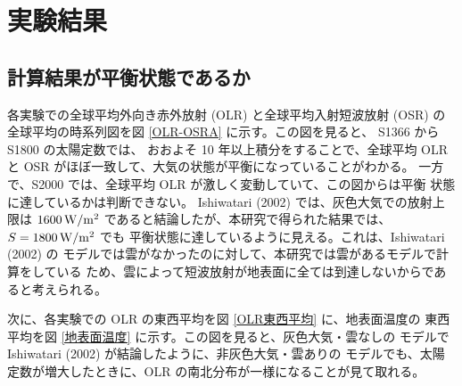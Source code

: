 \documentclass[body]{subfiles}
\begin{document}
\chapter{実験結果}

\section{計算結果が平衡状態であるか}

各実験での全球平均外向き赤外放射 (OLR) と全球平均入射短波放射 (OSR) の
全球平均の時系列図を図 \ref{OLR-OSRA} に示す。この図を見ると、 S1366
から S1800 の太陽定数では、 おおよそ 10 年以上積分をすることで、全球平均
OLR と OSR がほぼ一致して、大気の状態が平衡になっていることがわかる。
一方で、S2000 では、全球平均 OLR が激しく変動していて、この図からは平衡
状態に達しているかは判断できない。
Ishiwatari \etal (2002) では、灰色大気での放射上限は \(1600\hmu{W/m^2}\)
であると結論したが、本研究で得られた結果では、\(S=1800\hmu{W/m^2}\) でも
平衡状態に達しているように見える。これは、Ishiwatari \etal (2002) の
モデルでは雲がなかったのに対して、本研究では雲があるモデルで計算をしている
ため、雲によって短波放射が地表面に全ては到達しないからであると考えられる。

次に、各実験での OLR の東西平均を図 \ref{OLR東西平均} に、地表面温度の
東西平均を図 \ref{地表面温度} に示す。この図を見ると、灰色大気・雲なしの
モデルで Ishiwatari \etal (2002) が結論したように、非灰色大気・雲ありの
モデルでも、太陽定数が増大したときに、OLR の南北分布が一様になることが見て取れる。
\end{document}
